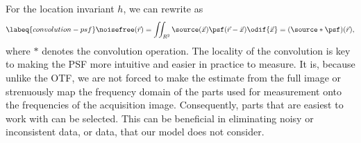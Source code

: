 For the location invariant \(h\), we can rewrite  as
    \begin{equation}
        \labeq{convolution-psf}
        \noisefree(\vec{r}) = \iint_{R^2} \source(\vec{x}) \psf(\vec{r} - \vec{x}) \odif{\vec{x}} = 
            (\source * \psf)(\vec{r}),
    \end{equation}
    where \(*\) denotes the convolution operation.
The locality of the convolution is key to making the 
    \ac{PSF} more intuitive and easier in practice to measure.
It is, because unlike the \ac{OTF}, we are not forced to make the estimate from the full image or strenuously map the
    frequency domain of the parts used for measurement onto the frequencies of the acquisition image.
Consequently, parts that are easiest to work with can be selected.
This can be beneficial in eliminating noisy or inconsistent data, or data, that our model does not consider.


